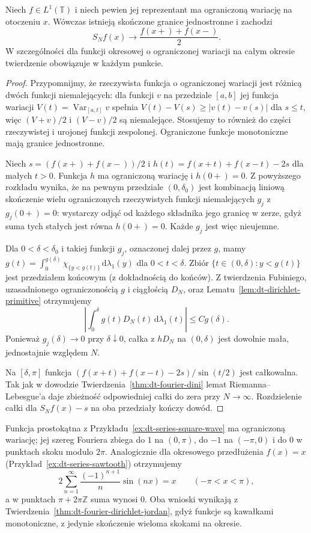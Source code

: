 \begin{twierdzenie}
\label{thm:dt-fourier-dirichlet-jordan}
Niech $f\in L^1(\mathbb T)$ i niech pewien jej
reprezentant ma ograniczoną wariację na otoczeniu
$x$. Wówczas istnieją skończone granice jednostronne
i zachodzi
\[
 S_Nf(x)\longrightarrow\frac{f(x+)+f(x-)}2.
\]
W szczególności dla funkcji okresowej o ograniczonej
wariacji na całym okresie twierdzenie obowiązuje
w każdym punkcie.
\end{twierdzenie}
\begin{proof}
Przypomnijmy, że rzeczywista funkcja o ograniczonej
wariacji jest różnicą dwóch funkcji niemalejących:
dla funkcji $v$ na przedziale $[a,b]$ jej
funkcja wariacji $V(t)=\operatorname{Var}_{[a,t]}v$
spełnia $V(t)-V(s)\ge |v(t)-v(s)|$ dla $s\le t$,
więc $(V+v)/2$ i $(V-v)/2$ są niemalejące.
Stosujemy to również do części rzeczywistej
i urojonej funkcji zespolonej. Ograniczone
funkcje monotoniczne mają granice jednostronne.

Niech $s=(f(x+)+f(x-))/2$ i
$h(t)=f(x+t)+f(x-t)-2s$ dla małych $t>0$.
Funkcja $h$ ma ograniczoną wariację i
$h(0+)=0$. Z powyższego rozkładu wynika,
że na pewnym przedziale $(0,\delta_0)$
jest kombinacją liniową skończenie wielu
ograniczonych rzeczywistych funkcji niemalejących
$g_j$ z $g_j(0+)=0$: wystarczy odjąć od każdego
składnika jego granicę w zerze, gdyż suma
tych stałych jest równa $h(0+)=0$.
Każde $g_j$ jest więc nieujemne.

Dla $0<\delta<\delta_0$ i takiej funkcji $g_j$,
oznaczonej dalej przez $g$, mamy
$g(t)=\int_0^{g(\delta)}\chi_{\{y<g(t)\}}
\,\mathrm d\lambda_1(y)$ dla $0<t<\delta$.
Zbiór $\{t\in(0,\delta):y<g(t)\}$ jest
przedziałem końcowym (z dokładnością do końców).
Z twierdzenia Fubiniego, uzasadnionego
ograniczonością $g$ i ciągłością $D_N$,
oraz Lematu~\ref{lem:dt-dirichlet-primitive}
otrzymujemy
\[
 \left|\int_0^\delta g(t)D_N(t)
 \,\mathrm d\lambda_1(t)\right|\le Cg(\delta).
\]
Ponieważ $g_j(\delta)\to0$ przy $\delta\downarrow0$,
całka z $hD_N$ na $(0,\delta)$ jest dowolnie
mała, jednostajnie względem $N$.

Na $[\delta,\pi]$ funkcja
$(f(x+t)+f(x-t)-2s)/\sin(t/2)$
jest całkowalna. Tak jak w dowodzie
Twierdzenia~\ref{thm:dt-fourier-dini}
lemat Riemanna--Lebesgue'a daje zbieżność
odpowiedniej całki do zera przy $N\to\infty$.
Rozdzielenie całki dla $S_Nf(x)-s$ na oba
przedziały kończy dowód.
\end{proof}

\begin{przyklad}
\label{ex:dt-fourier-jump-values}
Funkcja prostokątna z
Przykładu~\ref{ex:dt-series-square-wave}
ma ograniczoną wariację; jej szereg Fouriera
zbiega do $1$ na $(0,\pi)$, do $-1$ na $(-\pi,0)$
i do $0$ w punktach skoku modulo $2\pi$.
Analogicznie dla okresowego przedłużenia
$f(x)=x$ (Przykład~\ref{ex:dt-series-sawtooth})
otrzymujemy
\[
 2\sum_{n=1}^{\infty}\frac{(-1)^{n+1}}n\sin(nx)
 =x\qquad(-\pi<x<\pi),
\]
a w punktach $\pi+2\pi\mathbb Z$ suma wynosi $0$.
Oba wnioski wynikają z
Twierdzenia~\ref{thm:dt-fourier-dirichlet-jordan},
gdyż funkcje są kawałkami monotoniczne,
z jedynie skończenie wieloma skokami na okresie.
\end{przyklad}

